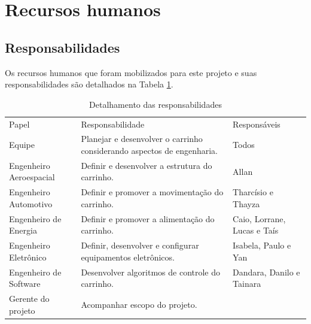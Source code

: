 \pagebreak

\section{Recursos humanos}

\subsection{Responsabilidades}
Os recursos humanos que foram mobilizados para este projeto e suas responsabilidades são detalhados na Tabela \ref{tab:responsabilidades}.


\begin{table}[h]
\caption {Detalhamento das responsabilidades} \label{tab:responsabilidades} 
 \centering
 {\renewcommand\arraystretch{1.25}
 \begin{tabular}{ l l l }
  \cline{1-1}\cline{2-2}\cline{3-3}  
    \multicolumn{1}{|p{2.567cm}|}{Papel} &
    \multicolumn{1}{p{6.433cm}|}{Responsabilidade} &
    \multicolumn{1}{p{2.417cm}|}{Responsáveis}
  \\  
  \cline{1-1}\cline{2-2}\cline{3-3}  
    \multicolumn{1}{|p{2.567cm}|}{Equipe} &
    \multicolumn{1}{p{6.433cm}|}{Planejar e desenvolver o carrinho considerando aspectos de engenharia.} &
    \multicolumn{1}{p{2.417cm}|}{Todos}
  \\  
  \cline{1-1}\cline{2-2}\cline{3-3}  
    \multicolumn{1}{|p{2.567cm}|}{Engenheiro Aeroespacial} &
    \multicolumn{1}{p{6.433cm}|}{Definir e desenvolver a estrutura do carrinho.} &
    \multicolumn{1}{p{2.417cm}|}{Allan}
  \\  
  \cline{1-1}\cline{2-2}\cline{3-3}  
    \multicolumn{1}{|p{2.567cm}|}{Engenheiro Automotivo} &
    \multicolumn{1}{p{6.433cm}|}{Definir e promover a movimentação do carrinho.} &
    \multicolumn{1}{p{2.417cm}|}{Tharcísio e Thayza}
  \\  
  \cline{1-1}\cline{2-2}\cline{3-3}  
    \multicolumn{1}{|p{2.567cm}|}{Engenheiro de Energia} &
    \multicolumn{1}{p{6.433cm}|}{Definir e promover a alimentação do carrinho.} &
    \multicolumn{1}{p{2.417cm}|}{Caio, Lorrane, Lucas e Taís}
  \\  
  \cline{1-1}\cline{2-2}\cline{3-3}  
    \multicolumn{1}{|p{2.567cm}|}{Engenheiro Eletrônico} &
    \multicolumn{1}{p{6.433cm}|}{Definir, desenvolver e configurar equipamentos eletrônicos.} &
    \multicolumn{1}{p{2.417cm}|}{Isabela, Paulo e Yan}
  \\  
  \cline{1-1}\cline{2-2}\cline{3-3}  
    \multicolumn{1}{|p{2.567cm}|}{Engenheiro de Software} &
    \multicolumn{1}{p{6.433cm}|}{Desenvolver algoritmos de controle do carrinho.} &
    \multicolumn{1}{p{2.417cm}|}{Dandara, Danilo e Tainara}
  \\  
  \cline{1-1}\cline{2-2}\cline{3-3}  
    \multicolumn{1}{|p{2.567cm}|}{Gerente do projeto} &
    \multicolumn{1}{p{6.433cm}|}{Acompanhar escopo do projeto.  			

}
\end{tabular}}
\end{table}
